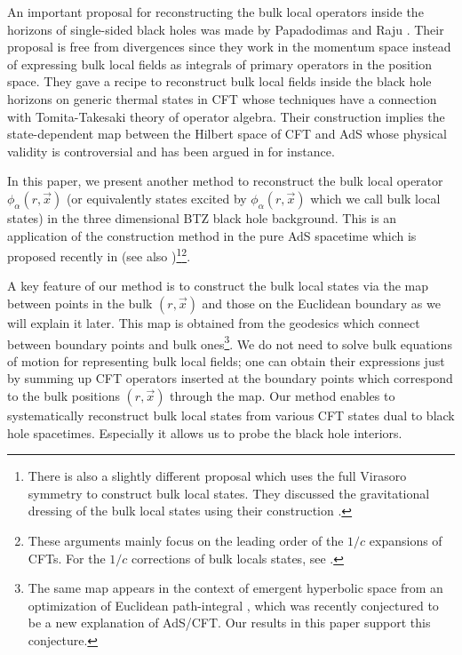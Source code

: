 \documentclass[11pt,a4paper]{article}
\def\a{{\alpha}}
\begin{document}
An important proposal for reconstructing the bulk local operators inside the horizons of single-sided black holes was made by Papadodimas and Raju \cite{PR1}\cite{PR2}\cite{PR3}. Their proposal is free from divergences since they work in the momentum space instead of expressing bulk local fields as integrals of primary operators in the position space. They gave a recipe to reconstruct bulk local fields inside the black hole horizons on generic thermal states in CFT whose techniques have a connection with Tomita-Takesaki theory of operator algebra. Their construction implies the state-dependent map between the Hilbert space of CFT and AdS whose physical validity is controversial and has been argued in \cite{H}\cite{MP} for instance.


In this paper, we present another method to reconstruct the bulk local operator $\phi_\a(r,\vec{x})$ (or equivalently states excited by $\phi_\a(r,\vec{x})$ which we call bulk local states) in the three dimensional BTZ black hole background. This is an application of the construction method in the pure AdS spacetime which is proposed recently in \cite{cMERA}\cite{NO} (see also \cite{Wan}\cite{GMT})\footnote{There is also a slightly different proposal \cite{Ver} which uses the full Virasoro symmetry to construct bulk local states. They discussed the gravitational dressing of the bulk local states using their construction \cite{VLT}.}\footnote{These arguments mainly focus on the leading order of the $1/c$ expansions of CFTs. For the $1/c$ corrections of bulk locals states, see \cite{NO2}\cite{VLT}. }.

A key feature of our method is to construct the bulk local states via the map between points in the bulk $(r,\vec{x})$ and those on the Euclidean boundary as we will explain it later. This map is obtained from the geodesics which connect between boundary points and bulk ones\footnote{The same map appears in the context of emergent hyperbolic space from an optimization of Euclidean path-integral \cite{OPT}, which was recently conjectured to be a new explanation of AdS/CFT. Our results in this paper support this conjecture.}. We do not need to solve bulk equations of motion for representing bulk local fields; one can obtain their expressions just by summing up CFT operators inserted at the boundary points which correspond to the bulk positions $(r,\vec{x})$ through the map. Our method enables to systematically reconstruct bulk local states from various CFT states dual to black hole spacetimes. Especially it allows us to probe the black hole interiors.
\end{document}
